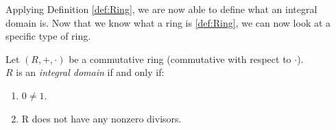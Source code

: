 \documentclass{article}
\begin{document}
Applying Definition \ref{def:Ring}, we are now able to define what an integral domain is.
Now that we know what a ring is \ref{def:Ring}, we can now look at a specific type of ring.

\begin{definition}\label{def:integralDomain}
    Let $(R,+,\cdot)$ be a commutative ring (commutative with respect to $\cdot$). \\  
    $R$ is an \emph{integral domain} if and only if:
    \begin{enumerate}
        \item $0 \neq 1$.
        \item R does not have any nonzero divisors.
    \end{enumerate}
\end{definition} \cite{AdvancedMath} \\ %
\end{document}
